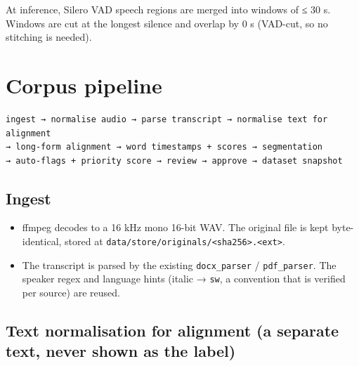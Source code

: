 \documentclass[11pt]{article}
\begin{document}
At inference, Silero VAD speech regions are merged into windows of ≤ 30 s. Windows are cut at the longest silence and overlap by 0 s (VAD-cut, so no stitching is needed).

\hypertarget{corpus-pipeline}{%
\section{Corpus pipeline}\label{corpus-pipeline}}

\begin{lstlisting}
ingest → normalise audio → parse transcript → normalise text for alignment
→ long-form alignment → word timestamps + scores → segmentation
→ auto-flags + priority score → review → approve → dataset snapshot
\end{lstlisting}

\hypertarget{ingest}{%
\subsection{Ingest}\label{ingest}}

\begin{itemize}
\tightlist
\item
  ffmpeg decodes to a 16 kHz mono 16-bit WAV. The original file is kept byte-identical, stored at \texttt{data/\allowbreak{}store/\allowbreak{}originals/\allowbreak{}<sha256>.\allowbreak{}<ext>}.
\item
  The transcript is parsed by the existing \texttt{docx\_\allowbreak{}parser} / \texttt{pdf\_\allowbreak{}parser}. The speaker regex and language hints (italic → \texttt{sw}, a convention that is verified per source) are reused.
\end{itemize}

\hypertarget{text-normalisation-for-alignment-a-separate-text-never-shown-as-the-label}{%
\subsection{Text normalisation for alignment (a separate text, never shown as the label)}\label{text-normalisation-for-alignment-a-separate-text-never-shown-as-the-label}}
\end{document}
